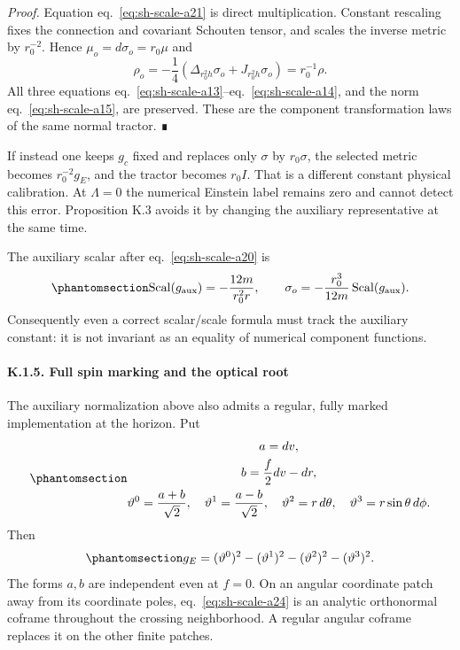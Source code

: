 \documentclass[
  english,
  11pt,
  reqno]{amsart}
\begin{document}
\emph{Proof.} Equation eq.~\ref{eq:sh-scale-a21} is direct
multiplication. Constant rescaling fixes the connection and covariant
Schouten tensor, and scales the inverse metric by \(r_0^{-2}\). Hence
\(\mu_o=d\sigma_o=r_0\mu\) and \[
\rho_o=-\frac14(\Delta_{r_0^2h}\sigma_o+J_{r_0^2h}\sigma_o)
=r_0^{-1}\rho.
\] All three equations
eq.~\ref{eq:sh-scale-a13}--eq.~\ref{eq:sh-scale-a14}, and the norm
eq.~\ref{eq:sh-scale-a15}, are preserved. These are the component
transformation laws of the same normal tractor. ∎

If instead one keeps \(g_c\) fixed and replaces only \(\sigma\) by
\(r_0\sigma\), the selected metric becomes \(r_0^{-2}g_E\), and the
tractor becomes \(r_0 I\). That is a different constant physical
calibration. At \(\Lambda=0\) the numerical Einstein label remains zero
and cannot detect this error. Proposition K.3 avoids it by changing the
auxiliary representative at the same time.

The auxiliary scalar after eq.~\ref{eq:sh-scale-a20} is
\begin{equation}\protect\phantomsection\label{eq:sh-scale-a23}{
\operatorname{Scal}(g_{\rm aux})=-\frac{12m}{r_0^2r},\qquad
\sigma_o=-\frac{r_0^3}{12m}\operatorname{Scal}(g_{\rm aux}).
}\end{equation} Consequently even a correct scalar/scale formula must
track the auxiliary constant: it is not invariant as an equality of
numerical component functions.

\protect{}\label{sec:sh-scale-5}

\paragraph{K.1.5. Full spin marking and the optical
root}\label{k.1.5.-full-spin-marking-and-the-optical-root}

The auxiliary normalization above also admits a regular, fully marked
implementation at the horizon. Put
\begin{equation}\protect\phantomsection\label{eq:sh-scale-a24}{\begin{gathered}
a=dv, \\
b=\frac f2dv-dr, \\
\vartheta^0=\frac{a+b}{\sqrt2},\quad
\vartheta^1=\frac{a-b}{\sqrt2},\quad
\vartheta^2=r\,d\theta,\quad
\vartheta^3=r\sin\theta\,d\phi.
\end{gathered}}\end{equation} Then
\begin{equation}\protect\phantomsection\label{eq:sh-scale-a25}{
g_E=(\vartheta^0)^2-(\vartheta^1)^2-(\vartheta^2)^2-(\vartheta^3)^2.
}\end{equation} The forms \(a,b\) are independent even at \(f=0\). On an
angular coordinate patch away from its coordinate poles,
eq.~\ref{eq:sh-scale-a24} is an analytic orthonormal coframe throughout
the crossing neighborhood. A regular angular coframe replaces it on the
other finite patches.
\end{document}
